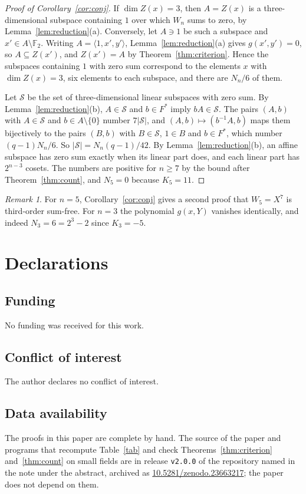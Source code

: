 \documentclass[11pt,a4paper,reqno]{amsart}
\theoremstyle{remark}
\newtheorem{remark}[theorem]{Remark}
\numberwithin{equation}{section}
\newcommand{\F}{\mathbb{F}}
\begin{document}
\begin{proof}[Proof of Corollary~\ref{cor:conj}]
If $\dim Z(x)=3$, then $A=Z(x)$ is a three-dimensional subspace containing $1$ over which $W_n$ sums to zero, by Lemma~\ref{lem:reduction}(a). Conversely, let $A\ni1$ be such a subspace and $x'\in A\setminus\F_2$. Writing $A=\langle1,x',y'\rangle$, Lemma~\ref{lem:reduction}(a) gives $g(x',y')=0$, so $A\subseteq Z(x')$, and $Z(x')=A$ by Theorem~\ref{thm:criterion}. Hence the subspaces containing $1$ with zero sum correspond to the elements $x$ with $\dim Z(x)=3$, six elements to each subspace, and there are $N_n/6$ of them.

Let $\mathcal S$ be the set of three-dimensional linear subspaces with zero sum. By Lemma~\ref{lem:reduction}(b), $A\in\mathcal S$ and $b\in F^*$ imply $bA\in\mathcal S$. The pairs $(A,b)$ with $A\in\mathcal S$ and $b\in A\setminus\{0\}$ number $7|\mathcal S|$, and $(A,b)\mapsto(b^{-1}A,b)$ maps them bijectively to the pairs $(B,b)$ with $B\in\mathcal S$, $1\in B$ and $b\in F^*$, which number $(q-1)N_n/6$. So $|\mathcal S|=N_n(q-1)/42$. By Lemma~\ref{lem:reduction}(b), an affine subspace has zero sum exactly when its linear part does, and each linear part has $2^{n-3}$ cosets. The numbers are positive for $n\ge7$ by the bound after Theorem~\ref{thm:count}, and $N_5=0$ because $K_5=11$.
\end{proof}

\begin{remark}
For $n=5$, Corollary~\ref{cor:conj} gives a second proof that $W_5=X^7$ is third-order sum-free. For $n=3$ the polynomial $g(x,Y)$ vanishes identically, and indeed $N_3=6=2^3-2$ since $K_3=-5$.
\end{remark}

\section*{Declarations}

\subsection*{Funding} No funding was received for this work.

\subsection*{Conflict of interest} The author declares no conflict of interest.

\subsection*{Data availability} The proofs in this paper are complete by hand. The source of the paper and programs that recompute Table~\ref{tab} and check Theorems~\ref{thm:criterion} and~\ref{thm:count} on small fields are in release \texttt{v2.0.0} of the repository named in the note under the abstract, archived as \href{https://doi.org/10.5281/zenodo.23663217}{10.5281/zenodo.23663217}; the paper does not depend on them.
\end{document}
